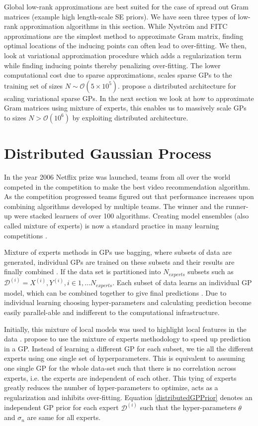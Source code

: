 Global low-rank approximations are best suited for the case of spread out Gram matrices (example high length-scale SE priors). We have seen three types of low-rank approximation algorithms in this section. While Nystr\"{o}m and FITC approximations are the simplest method to approximate Gram matrix, finding optimal locations of the inducing points can often lead to over-fitting. We then, look at variational approximation procedure which adds a regularization term while finding inducing points thereby penalizing over-fitting. The lower computational cost due to sparse approximations, scales sparse GPs to the training set of sizes $N \sim \mathcal{O}(5 \times 10^5)$. \cite{Gal2014Distributed} propose a distributed architecture for scaling variational sparse GPs. In the next section we look at how to approximate Gram matrices using mixture of experts, this enables us to massively scale GPs to sizes $N > \mathcal{O}(10^6)$ by exploiting distributed architecture.

\section{Distributed Gaussian Process}\label{secDgp}
In the year 2006 Netflix prize was launched, teams from all over the world competed in the competition to make the best video recommendation algorithm. As the competition progressed teams figured out that performance increases upon combining algorithms developed by multiple teams. The winner and the runner-up were stacked learners of over 100 algorithms. Creating model ensembles (also called mixture of experts) is now a standard practice in many learning competitions \cite{bauer1998empirical}. 

Mixture of experts methods in GPs use bagging, where subsets of data are generated, individual GPs are trained on these subsets and their results are finally combined \cite{chen2009bagging}. If the data set is partitioned  into $N_{experts}$ subsets such as $\mathcal{D}^{(i)} = {X^{(i)}, Y^{(i)}}, i \in 1, \ldots N_{experts}$. Each subset of data learns an individual GP model, which can be combined together to give final predictions . Due to individual learning choosing hyper-parameters and calculating prediction become easily parallel-able and indifferent to the computational infrastructure. 

Initially, this mixture of local models was used to highlight local features in the data \cite{rasmussen2002infinite}. \cite{ng2014hierarchical} propose to use the mixture of experts methodology to speed up prediction in a GP. Instead of learning a different GP for each subset, we tie all the different experts using one single set of hyperparameters. This is equivalent to assuming one single GP for the whole data-set such that there is no correlation across experts, i.e. the experts are independent of each other. This tying of experts greatly reduces the number of hyper-parameters to optimize, acts as a regularization and inhibits over-fitting. Equation \ref{distributedGPPrior} denotes an independent GP prior for each expert $\mathcal{D}^{(i)}$ such that the hyper-parameters $\theta$ and $\sigma_{n}$ are same for all experts.

